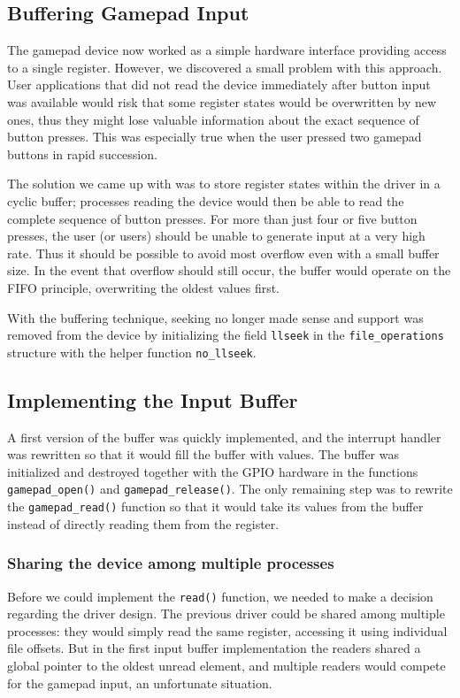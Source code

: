 \subsection{Buffering Gamepad Input}
The gamepad device now worked as a simple hardware interface providing access to a single register. However, we discovered a small problem with this approach. User applications that did not read the device immediately after button input was available would risk that some register states would be overwritten by new ones, thus they might lose valuable information about the exact sequence of button presses. This was especially true when the user pressed two gamepad buttons in rapid succession.

The solution we came up with was to store register states within the driver in a cyclic buffer; processes reading the device would then be able to read the complete sequence of button presses. For more than just four or five button presses, the user (or users) should be unable to generate input at a very high rate. Thus it should be possible to avoid most overflow even with a small buffer size. In the event that overflow should still occur, the buffer would operate on the FIFO principle, overwriting the oldest values first.

With the buffering technique, seeking no longer made sense and support was removed from the device by initializing the field \texttt{llseek} in the \texttt{file\_operations} structure with the helper function \texttt{no\_llseek}.

\subsection{Implementing the Input Buffer}
A first version of the buffer was quickly implemented, and the interrupt handler was rewritten so that it would fill the buffer with values. The buffer was initialized and destroyed together with the GPIO hardware in the functions \texttt{gamepad\_open()} and \texttt{gamepad\_release()}. The only remaining step was to rewrite the \texttt{gamepad\_read()} function so that it would take its values from the buffer instead of directly reading them from the register. 

\subsubsection{Sharing the device among multiple processes}
Before we could implement the \texttt{read()} function, we needed to make a decision regarding the driver design. The previous driver could be shared among multiple processes: they would simply read the same register, accessing it using individual file offsets. But in the first input buffer implementation the readers shared a global pointer to the oldest unread element, and multiple readers would compete for the gamepad input, an unfortunate situation.

